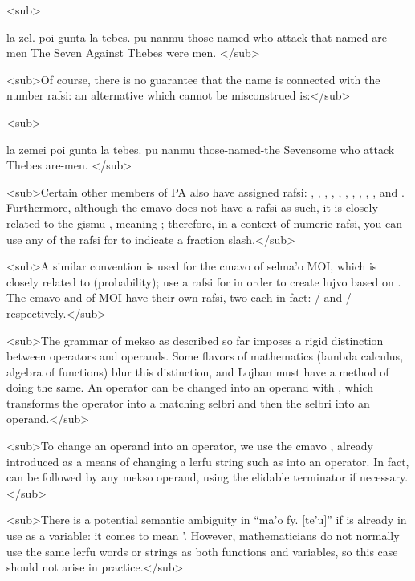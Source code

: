 <sub>
\begin{example}
la zel. poi gunta\n
\T	la tebes. pu nanmu\n
those-named  who attack\n
\T	that-named   are-men\n
The Seven Against Thebes were men.
</sub>
\end{example}

<sub>Of course, there is no guarantee that the name 
    is connected with the number rafsi: an alternative which cannot
    be misconstrued is:</sub>

<sub>
\begin{example}
la zemei poi gunta\n
\T	la tebes. pu nanmu\n
those-named-the Sevensome who attack\n
\T	Thebes  are-men.
</sub>
\end{example}

<sub>Certain other members of PA also have assigned rafsi:
    , , , , , ,
    , , , , and . Furthermore,
    although the cmavo  does not have a rafsi as such, it
    is closely related to the gismu , meaning
    ; therefore, in a context of numeric rafsi, you can
    use any of the rafsi for  to indicate a fraction
    slash.</sub>

<sub>A similar convention is used for the cmavo  of
    selma'o MOI, which is closely related to 
    (probability); use a rafsi for  in order to create
    lujvo based on . The cmavo  and  of MOI
    have their own rafsi, two each in fact: / and
    / respectively.</sub>

<sub>The grammar of mekso as described so far imposes a
    rigid distinction between operators and operands. Some flavors
    of mathematics (lambda calculus, algebra of functions) blur
    this distinction, and Lojban must have a method of doing the
    same. An operator can be changed into an operand with
    , which transforms the operator into a matching
    selbri and then the selbri into an operand.</sub>

<sub>To change an operand into an operator, we use the cmavo
    , already introduced as a means of changing a lerfu
    string such as  into an operator. In fact,  can
    be followed by any mekso operand, using the elidable terminator
     if necessary.</sub>

<sub>There is a potential semantic ambiguity in ``ma'o fy.
    [te'u]'' if  is already in use as a variable: it comes
    to mean '. However,
    mathematicians do not normally use the same lerfu words or
    strings as both functions and variables, so this case should
    not arise in practice.</sub>

